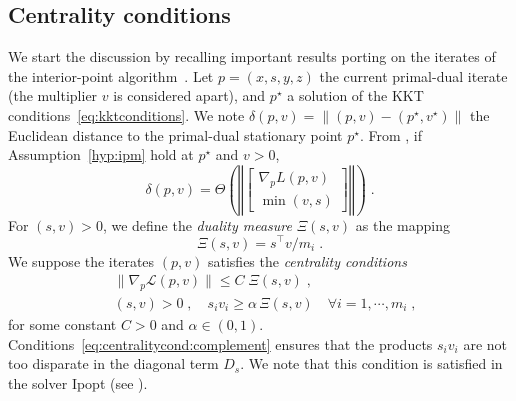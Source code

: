 \subsection{Centrality conditions}
We start the discussion by recalling important results porting
on the iterates of the interior-point algorithm~\cite{wright2001effects}.
Let $p = (x, s, y, z)$ the current primal-dual iterate (the multiplier $v$ is considered apart),
and $p^\star$ a solution of the KKT conditions~\eqref{eq:kktconditions}.
We note $\delta(p, v) = \| (p, v) - (p^\star, v^\star) \|$ the Euclidean distance to the
primal-dual stationary point $p^\star$.
From \cite[Theorem 2.2]{wright2001effects}, if Assumption~\ref{hyp:ipm}
hold at $p^\star$ and $v > 0$,
\begin{equation}
  \delta(p, v) = \Theta\left( \left\Vert \begin{bmatrix}
      \nabla_p L(p, v) \\ \min(v, s)
  \end{bmatrix}
  \right\Vert \right) \; .
\end{equation}
For $(s, v) > 0$, we define the \emph{duality measure} $\Xi(s, v)$ as the mapping
\begin{equation}
  \Xi(s, v) = s^\top v / m_i \; .
\end{equation}
We suppose the iterates $(p, v)$ satisfies the \emph{centrality conditions}
\begin{subequations}
  \label{eq:centralitycond}
  \begin{align}
    & \| \nabla_p \mathcal{L}(p, v) \| \leq C \; \Xi(s, v) \;,  \\
    \label{eq:centralitycond:complement}
    & (s, v) > 0 \;,\quad s_i v_i \geq \alpha \, \Xi(s, v) \quad \forall i =1, \cdots, m_i \; ,
  \end{align}
\end{subequations}
for some constant $C > 0$ and $\alpha \in (0, 1)$.
Conditions~\eqref{eq:centralitycond:complement} ensures that the products
$s_i v_i$ are not too disparate in the diagonal term $D_s$.
We note that this condition is satisfied in the solver Ipopt (see \cite[Equation (16)]{wachter2006implementation}).


